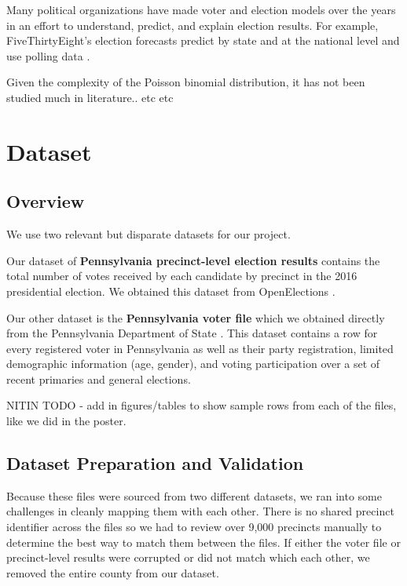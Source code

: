 \documentclass[10pt, letterpaper]{article}
\begin{document}
Many political organizations have made voter and election  models over the years in an effort to understand, predict, and explain election results. For example, FiveThirtyEight's election forecasts predict by state and at the national level and use polling data \cite{538}. 

Given the complexity of the Poisson binomial distribution, it has not been studied much in literature.. etc etc

\section{Dataset}

\subsection{Overview}

We use two relevant but disparate datasets for our project.

Our dataset of \textbf{Pennsylvania precinct-level election results} contains the total number of votes received by each candidate by precinct in the 2016 presidential election. We obtained this dataset from OpenElections \cite{OpenElections}.

Our other dataset is the \textbf{Pennsylvania voter file} which we obtained directly from the Pennsylvania Department of State \cite{PAVoterFile}. This dataset contains a row for every registered voter in Pennsylvania as well as their party registration, limited demographic information (age, gender), and voting participation over a set of recent primaries and general elections.

NITIN TODO - add in figures/tables to show sample rows from each of the files, like we did in the poster.

\subsection{Dataset Preparation and Validation}

Because these files were sourced from two different datasets, we ran into some challenges in cleanly mapping them with each other. There is no shared precinct identifier across the files so we had to review over 9,000 precincts manually to determine the best way to match them between the files. If either the voter file or precinct-level results were corrupted or did not match which each other, we removed the entire county from our dataset.
\end{document}
